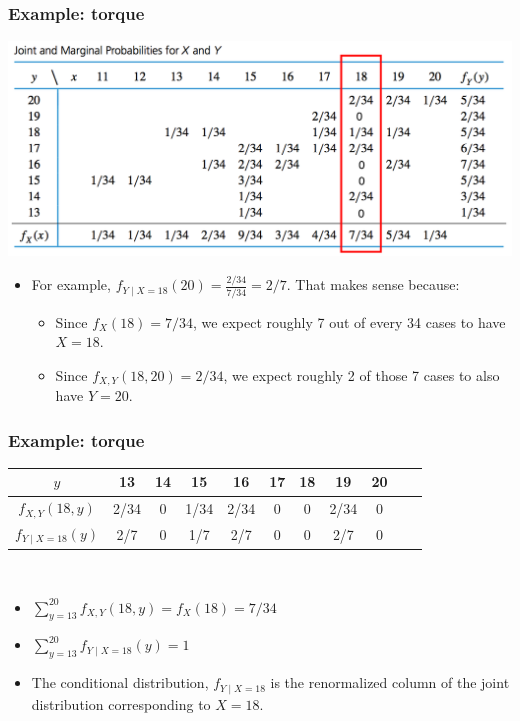 \documentclass[handout]{beamer}\usepackage[]{graphicx}\usepackage[]{color}
\providecommand{\q}{$\quad$ \newline}
\numberwithin{equation}{section}
\begin{document}
\begin{frame}
\frametitle{Example: torque} \small
{} \includegraphics{../../fig/torquetablemar2.png}
\begin{itemize}
\pause \item For example, $f_{Y \mid X = 18}(20) = \frac{2/34}{7/34} = 2/7$. That makes sense because:
\begin{itemize}
\pause \item Since $f_{X}(18) = 7/34$, we expect roughly 7 out of every 34 cases to have $X = 18$.
\pause \item Since $f_{X, Y}(18, 20) = 2/34$, we expect roughly 2 of those 7 cases to also have $Y = 20$.
\end{itemize}
\end{itemize}
\end{frame}

\begin{frame}
\frametitle{Example: torque} \small
\begin{tabular}{ccccccccccc}
$y$ & 13 & 14 & 15 & 16 & 17 & 18 & 19 & 20 \\ \hline
$f_{X, Y}(18, y)$ & 2/34 & 0 & 1/34 & 2/34 & 0 & 0 & 2/34 & 0 \\
$f_{Y \mid X = 18}(y)$ & 2/7 & 0 & 1/7 & 2/7 & 0 & 0 & 2/7 & 0
\end{tabular} \q
\begin{itemize}
\pause \item $\sum_{y = 13}^{20} f_{X, Y}(18, y) = f_{X}(18) = 7/34$ 
\pause \item $\sum_{y = 13}^{20}f_{Y \mid X = 18}(y) = 1$
\pause \item The conditional distribution, $f_{Y \mid X = 18}$ is the renormalized column of the joint distribution corresponding to $X = 18$.
\end{itemize}
\end{frame}
\end{document}
